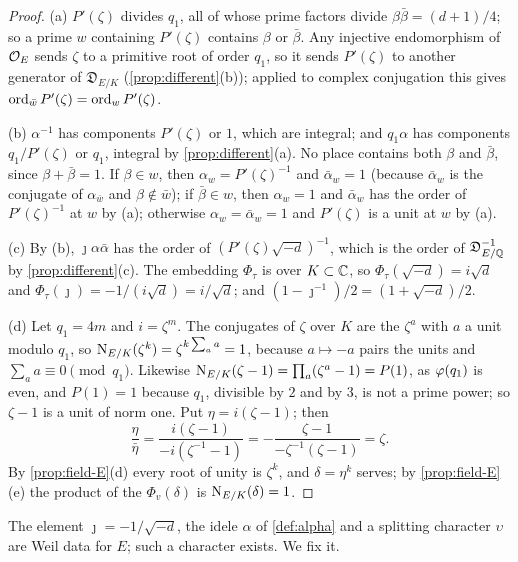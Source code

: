 \begin{proof}
(a) $P'(\zeta)$ divides $q_1$, all of whose prime factors divide $\beta\bar\beta=(d+1)/4$; so a prime
$w$ containing $P'(\zeta)$ contains $\beta$ or $\bar\beta$. Any injective endomorphism of $\mathcal{O}_E$
sends $\zeta$ to a primitive root of order $q_1$, so it sends $P'(\zeta)$ to another generator of
$\mathfrak D_{E/K}$ (\cref{prop:different}(b)); applied to complex conjugation this gives
$\operatorname{ord}_{\bar w}P'(\zeta)=\operatorname{ord}_wP'(\zeta)$.

(b) $\alpha^{-1}$ has components $P'(\zeta)$ or $1$, which are integral; and $q_1\alpha$ has
components $q_1/P'(\zeta)$ or $q_1$, integral by \cref{prop:different}(a). No place contains both
$\beta$ and $\bar\beta$, since $\beta+\bar\beta=1$. If $\beta\in w$, then $\alpha_w=P'(\zeta)^{-1}$
and $\bar\alpha_w=1$ (because $\bar\alpha_w$ is the conjugate of $\alpha_{\bar w}$ and $\beta\notin\bar
w$); if $\bar\beta\in w$, then $\alpha_w=1$ and $\bar\alpha_w$ has the order of $P'(\zeta)^{-1}$ at
$w$ by (a); otherwise $\alpha_w=\bar\alpha_w=1$ and $P'(\zeta)$ is a unit at $w$ by (a).

(c) By (b), $\jmath\alpha\bar\alpha$ has the order of $(P'(\zeta)\sqrt{-d})^{-1}$, which is the order of
$\mathfrak D_{E/\mathbb{Q}}^{-1}$ by \cref{prop:different}(c). The embedding $\Phi_\tau$ is over $K\subset\mathbb{C}$,
so $\Phi_\tau(\sqrt{-d})=i\sqrt d$ and $\Phi_\tau(\jmath)=-1/(i\sqrt d)=i/\sqrt d$; and
$(1-\jmath^{-1})/2=(1+\sqrt{-d})/2$.

(d) Let $q_1=4m$ and $i=\zeta^m$. The conjugates of $\zeta$ over $K$ are the $\zeta^a$ with $a$ a
unit modulo $q_1$, so $\operatorname{N}_{E/K}(\zeta^k)=\zeta^{k\sum_aa}=1$, because $a\mapsto-a$ pairs the units and
$\sum_aa\equiv0\pmod{q_1}$. Likewise $\operatorname{N}_{E/K}(\zeta-1)=\prod_a(\zeta^a-1)=P(1)$, as $\varphi(q_1)$ is
even, and $P(1)=1$ because $q_1$, divisible by $2$ and by $3$, is not a prime power; so $\zeta-1$ is
a unit of norm one. Put $\eta=i(\zeta-1)$; then
\[
  \frac{\eta}{\bar\eta}=\frac{i(\zeta-1)}{-i(\zeta^{-1}-1)}=-\frac{\zeta-1}{-\zeta^{-1}(\zeta-1)}=\zeta .
\]
By \cref{prop:field-E}(d) every root of unity is $\zeta^k$, and $\delta=\eta^k$ serves; by
\cref{prop:field-E}(e) the product of the $\Phi_v(\delta)$ is $\operatorname{N}_{E/K}(\delta)=1$.
\end{proof}

\begin{proposition}\label{prop:weil-data-E}
The element $\jmath=-1/\sqrt{-d}$, the idele $\alpha$ of \cref{def:alpha} and a splitting character
$\upsilon$ are Weil data for $E$; such a character exists. We fix it.
\end{proposition}

